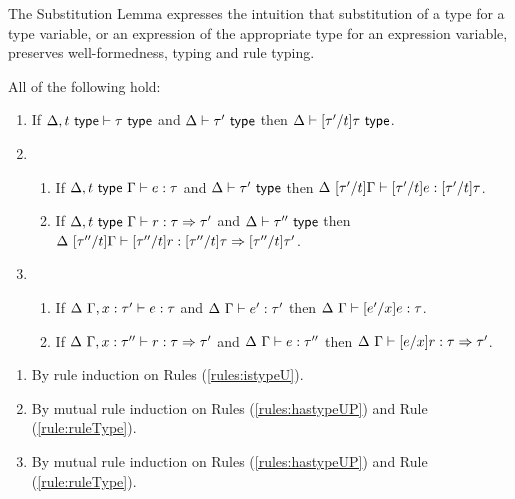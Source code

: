 {{{{The Substitution Lemma expresses the intuition that substitution of a type for a type variable, or an expression of the appropriate type for an expression variable, preserves well-formedness, typing and rule typing.
\begin{lemma}[Substitution]\label{lemma:substitution-UP} All of the following hold:
\begin{enumerate}
\item If $\Delta, t~\mathsf{type} \vdash \tau~\mathsf{type}$ and $\Delta \vdash \tau'~\mathsf{type}$ then $\Delta \vdash [\tau'/t]\tau~\mathsf{type}$.
\item \begin{enumerate}
  \item If $\Delta, t~\mathsf{type}~\Gamma \vdash e : \tau$ and $\Delta \vdash \tau'~\mathsf{type}$ then $\Delta~[\tau'/t]\Gamma \vdash [\tau'/t]e : [\tau'/t]\tau$.
  \item If $\Delta, t~\mathsf{type}~\Gamma \vdash r : \tau \Rightarrow \tau'$ and $\Delta \vdash \tau''~\mathsf{type}$ then $\Delta~[\tau''/t]\Gamma \vdash [\tau''/t]r : [\tau''/t]\tau \Rightarrow [\tau''/t]\tau'$.
  \end{enumerate}
\item \begin{enumerate}
  \item If $\Delta~\Gamma, x : \tau' \vdash e : \tau$ and $\Delta~\Gamma \vdash e' : \tau'$ then $\Delta~\Gamma \vdash [e'/x]e : \tau$.
  \item If $\Delta~\Gamma, x : \tau'' \vdash r : \tau \Rightarrow \tau'$ and $\Delta~\Gamma \vdash e : \tau''$ then $\Delta~\Gamma \vdash [e/x]r : \tau \Rightarrow \tau'$.
  \end{enumerate}
\end{enumerate}\end{lemma}
\begin{proof-sketch}
\begin{enumerate}
\item By rule induction on Rules (\ref{rules:istypeU}).
\item By mutual rule induction on Rules (\ref{rules:hastypeUP}) and Rule (\ref{rule:ruleType}).
\item By mutual rule induction on Rules (\ref{rules:hastypeUP}) and Rule (\ref{rule:ruleType}).
\end{enumerate}
\end{proof-sketch}

}}}}
